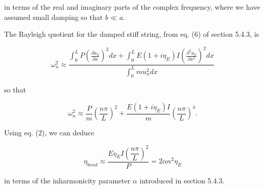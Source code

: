   \noindent{}in terms of the real and imaginary parts of the complex frequency, 
  where we have assumed small damping so that $b \ll a$. 

  The Rayleigh quotient for the damped stiff string, from eq. (6) of section 
  5.4.3, is 

  \begin{equation*}\omega_n^2 \approx \dfrac{\int_0^L{P \left(\frac{\partial 
  u_n}{\partial x}\right)^2} dx + \int_0^L{E(1+i \eta_E) I 
  \left(\frac{\partial^2 u_n}{\partial x^2}\right)^2} dx}{\int_0^L{m u_n^2} dx} 
  \tag{3}\end{equation*} 

  \noindent{}so that 

  \begin{equation*}\omega_n^2 \approx \dfrac{P}{m} \left(\dfrac{n 
  \pi}{L}\right)^2 + \dfrac{E(1+i \eta_E)I}{m} \left(\dfrac{n \pi}{L}\right)^4 
  . \tag{4}\end{equation*} 

  Using eq. (2), we can deduce 

  \begin{equation*}\eta_{bend} \approx \dfrac{E \eta_E I \left(\dfrac{n 
  \pi}{L}\right)^2}{P} = 2 \alpha n^2 \eta_E\end{equation*} 

  \noindent{}in terms of the inharmonicity parameter $\alpha$ introduced in 
  section 5.4.3. 